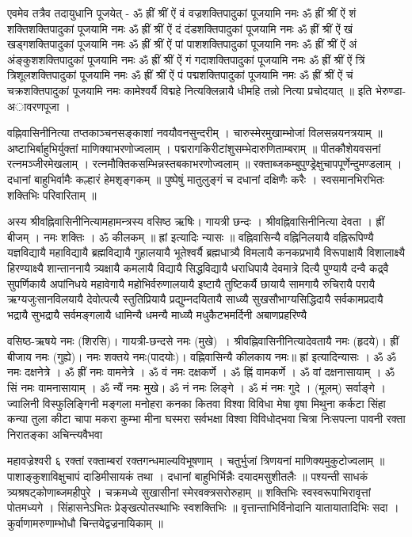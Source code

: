 एवमेव तत्रैव तदायुधानि पूजयेत् -
ॐ ह्रीं श्रीं ऐं वं वज्रशक्तिपादुकां पूजयामि नमः
ॐ ह्रीं श्रीं ऐं शं शक्तिशक्तिपादुकां पूजयामि नमः
ॐ ह्रीं श्रीं ऐं दं दंडशक्तिपादुकां पूजयामि नमः
ॐ ह्रीं श्रीं ऐं खं खड्गशक्तिपादुकां पूजयामि नमः
ॐ ह्रीं श्रीं ऐं पां पाशशक्तिपादुकां पूजयामि नमः
ॐ ह्रीं श्रीं ऐं अं अंङ्कुशशक्तिपादुकां पूजयामि नमः
ॐ ह्रीं श्रीं ऐं गं गदाशक्तिपादुकां पूजयामि नमः
ॐ ह्रीं श्रीं ऐं त्रिं त्रिशूलशक्तिपादुकां पूजयामि नमः
ॐ ह्रीं श्रीं ऐं पं पद्मशक्तिपादुकां पूजयामि नमः
ॐ ह्रीं श्रीं ऐं चं चक्रशक्तिपादुकां पूजयामि नमः
कामेश्वर्यै विद्महे नित्यक्लिन्नायै धीमहि तन्नो नित्या प्रचोदयात् ॥
इति भेरुण्डा-अावरणपूजा ।

वह्निवासिनीनित्या
तप्तकाञ्चनसङ्काशां नवयौवनसुन्दरीम् । चारुस्मेरमुखाम्भोजां विलसन्नयनत्रयाम् ॥
अष्टाभिर्बाहुभिर्युक्तां माणिक्याभरणोज्वलाम् । पद्मरागकिरीटांशुसम्भेदारुणिताम्बराम् ॥
पीतकौशेयवसनां रत्नमञ्जीरमेखलाम् । रत्नमौक्तिकसम्भिन्नस्तबकाभरणोज्वलाम् ॥
रक्ताब्जकम्बुपुण्ड्रेक्षुचापपूर्णेन्दुमण्डलाम् । दधानां बाहुभिर्वामैः कल्हारं हेमशृङ्गकम् ॥
पुष्पेषुं मातुलुङ्गं च दधानां दक्षिणैः करैः । स्वसमानभिरभितः शक्तिभिः परिवारिताम् ॥

अस्य श्रीवह्निवासिनीनित्यामहामन्त्रस्य वसिष्ठ ऋषिः। गायत्री छन्दः । श्रीवह्निवासिनीनित्या देवता । ह्रीं बीजम् । नमः शक्तिः । ॐ कीलकम् ॥
ह्रां इत्यादिः न्यासः ॥
वह्निवासिन्यै वह्निनिलयायै वह्निरूपिण्यै यज्ञविद्यायै महाविद्यायै ब्रह्मविद्यायै गुहालयायै भूतेश्वर्यै ब्रह्मधात्र्यै विमलायै कनकप्रभायै विरूपाक्षायै विशालाक्ष्यै हिरण्याक्ष्यै शान्ताननायै त्र्यक्षायै कमलायै विद्यायै सिद्धविद्यायै धराधिपायै देवमात्रे दित्यै पुण्यायै दन्वै कद्र्वै सुपर्णिकायै अपांनिधये महावेगायै महोभिर्वरुणालयायै इष्टायै तुष्टिकर्यै छायायै सामगायै रुचिरायै परायै ऋग्यजुःसानविलयायै देवोत्पत्यै स्तुतिप्रियायै प्रद्युम्नदयितायै साध्व्यै सुखसौभाग्यसिद्धिदायै सर्वकामप्रदायै भद्रायै सुभद्रायै सर्वमङ्गलायै धामिन्यै धमन्यै माध्व्यै मधुकैटभमर्दिनी अबाणप्रहरिण्यै

वसिष्ठ-ऋषये नमः (शिरसि)। गायत्री-छन्दसे नमः (मुखे)~। श्रीवह्निवासिनीनित्यादेवतायै नमः (हृदये)। ह्रीं बीजाय नमः (गुह्ये)। नमः शक्तये नमः(पादयोः)।
वह्निवासिन्यै कीलकाय नमः॥
ह्रां इत्यादिन्यासः ।
ॐ ॐ नमः दक्षनेत्रे । ॐ ह्रीं नमः वामनेत्रे । ॐ वं नमः दक्षकर्णे । ॐ ह्निं वामकर्णे । ॐ वां दक्षनासायाम् । ॐ सिं नमः वामनासायाम् । ॐ न्यैं नमः मुखे। ॐ नं नमः लिङ्गे । ॐ मं नमः गुदे । (मूलम्) सर्वाङ्गे ।
ज्वालिनी विस्फुलिङ्गिनी मङ्गला मनोहरा कनका कितवा विश्वा विविधा मेषा वृषा मिथुना कर्कटा सिंहा कन्या तुला कीटा चापा मकरा कुम्भा मीना घस्मरा सर्वभक्षा विश्वा विविधोद्भवा चित्रा निःसपत्ना पावनी रक्ता निरातङ्का अचिन्त्यवैभवा 

महावज्रेश्वरी ६
रक्तां रक्ताम्बरां रक्तगन्धमाल्यविभूषणाम् । चतुर्भुजां त्रिणयनां माणिक्यमुकुटोज्वलाम् ॥
पाशाङ्कुशाविक्षुचापं दाडिमीसायकं तथा । दधानां बाहुभिर्भिन्नैः दयादमसुशीतलैः ॥
पश्यन्ती साधकं त्र्यश्रषट्कोणाब्जमहीपुरे । चक्रमध्ये सुखासीनां स्मेरवक्त्रसरोरुहाम् ॥
शक्तिभिः स्वस्वरूपाभिरावृत्तां पोतमध्यगे । सिंहासनेऽभितः प्रेङ्खत्पोतस्थाभिः स्वशक्तिभिः ॥
वृत्तान्ताभिर्विनोदानि यातायातादिभिः सदा । कुर्वाणामरुणाम्भोधौ चिन्तयेद्वज्रनायिकाम् ॥

